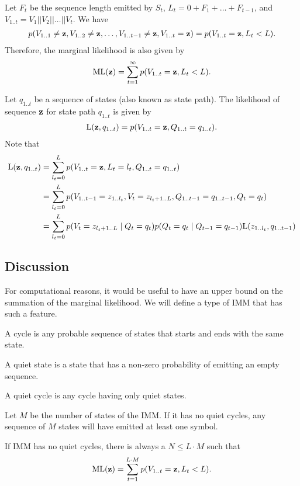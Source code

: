 Let $F_t$ be the sequence length emitted by $S_t$, $L_t = 0+F_1+\dots+F_{t-1}$,
and $V_{1..t} = V_1||V_2||\dots||V_t$.
We have
\begin{align*}
  p(V_{1..1} \neq \mathbf{z}, V_{1..2} \neq \mathbf{z}, \dots, V_{1..{t-1}} \neq \mathbf{z}, V_{1..t}=\mathbf{z})
  = p(V_{1..t}=\mathbf{z}, L_t<L).
\end{align*}
Therefore, the marginal likelihood is also given by
\begin{align*}
  \mathrm{ML}(\mathbf{z}) = \sum_{t=1}^{\infty} p(V_{1..t}=\mathbf{z}, L_t<L).
\end{align*}

Let $q_{1..t}$ be a sequence of states (also known as state path).
The likelihood of sequence $\mathbf{z}$ for state path $q_{1..t}$ is given by
\begin{align*}
  \mathrm{L}(\mathbf{z}, q_{1..t}) = p(V_{1..t}=\mathbf{z}, Q_{1..t}=q_{1..t}).
\end{align*}
Note that
\begin{align*}
  \mathrm{L}(\mathbf{z}, q_{1..t}) &= \sum_{l_t=0}^L p(V_{1..t}=\mathbf{z}, L_t=l_t,
  Q_{1..t}=q_{1..t})\\
  &= \sum_{l_t=0}^L p(V_{1..t-1}=z_{1..l_t}, V_t=z_{l_t+1..L}, Q_{1..t-1}=q_{1..t-1}, Q_t=q_t)\\
  &= \sum_{l_t=0}^L p(V_t=z_{l_t+1..L} \;|\; Q_t=q_t) p(Q_t=q_t \;|\; Q_{t-1}=q_{t-1})
  \mathrm{L}(z_{1..l_t}, q_{1..t-1})
\end{align*}

\subsection{Discussion}

For computational reasons, it would be useful to have an upper bound on the summation of the
marginal likelihood.
We will define a type of IMM that has such a feature.

\begin{definition}
  A cycle is any probable sequence of states that starts and ends with the same state.
\end{definition}

\begin{definition}
  A quiet state is a state that has a non-zero probability of emitting an empty sequence.
\end{definition}

\begin{definition}
  A quiet cycle is any cycle having only quiet states.
\end{definition}

\begin{corollary}
  Let $M$ be the number of states of the IMM. If it has no quiet cycles, any sequence of $M$ states
  will have emitted at least one symbol.
\end{corollary}

If IMM has no quiet cycles, there is always a $N \leq L\cdot M$ such that
\begin{align*}
  \mathrm{ML}(\mathbf{z}) = \sum_{t=1}^{L\cdot M} p(V_{1..t}=\mathbf{z}, L_t<L).
\end{align*}
